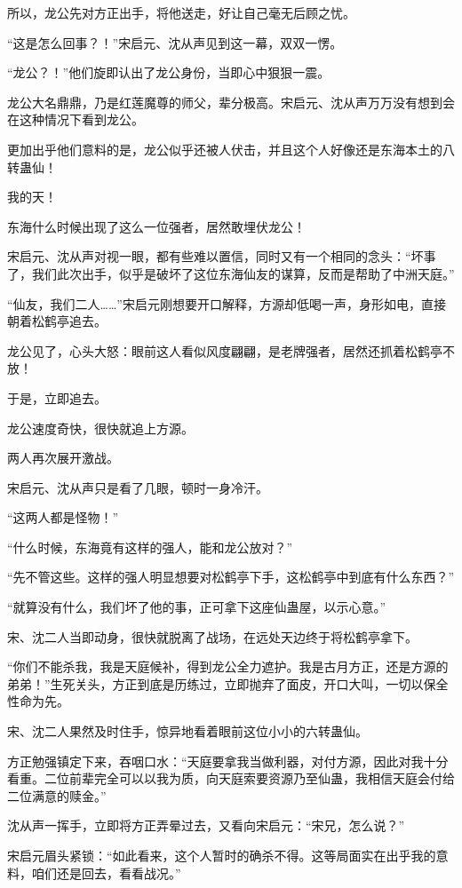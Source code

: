 \begin{this_body}
所以，龙公先对方正出手，将他送走，好让自己毫无后顾之忧。

“这是怎么回事？！”宋启元、沈从声见到这一幕，双双一愣。

“龙公？！”他们旋即认出了龙公身份，当即心中狠狠一震。

龙公大名鼎鼎，乃是红莲魔尊的师父，辈分极高。宋启元、沈从声万万没有想到会在这种情况下看到龙公。

更加出乎他们意料的是，龙公似乎还被人伏击，并且这个人好像还是东海本土的八转蛊仙！

我的天！

东海什么时候出现了这么一位强者，居然敢埋伏龙公！

宋启元、沈从声对视一眼，都有些难以置信，同时又有一个相同的念头：“坏事了，我们此次出手，似乎是破坏了这位东海仙友的谋算，反而是帮助了中洲天庭。”

“仙友，我们二人……”宋启元刚想要开口解释，方源却低喝一声，身形如电，直接朝着松鹤亭追去。

龙公见了，心头大怒：眼前这人看似风度翩翩，是老牌强者，居然还抓着松鹤亭不放！

于是，立即追去。

龙公速度奇快，很快就追上方源。

两人再次展开激战。

宋启元、沈从声只是看了几眼，顿时一身冷汗。

“这两人都是怪物！”

“什么时候，东海竟有这样的强人，能和龙公放对？”

“先不管这些。这样的强人明显想要对松鹤亭下手，这松鹤亭中到底有什么东西？”

“就算没有什么，我们坏了他的事，正可拿下这座仙蛊屋，以示心意。”

宋、沈二人当即动身，很快就脱离了战场，在远处天边终于将松鹤亭拿下。

“你们不能杀我，我是天庭候补，得到龙公全力遮护。我是古月方正，还是方源的弟弟！”生死关头，方正到底是历练过，立即抛弃了面皮，开口大叫，一切以保全性命为先。

宋、沈二人果然及时住手，惊异地看着眼前这位小小的六转蛊仙。

方正勉强镇定下来，吞咽口水：“天庭要拿我当做利器，对付方源，因此对我十分看重。二位前辈完全可以以我为质，向天庭索要资源乃至仙蛊，我相信天庭会付给二位满意的赎金。”

沈从声一挥手，立即将方正弄晕过去，又看向宋启元：“宋兄，怎么说？”

宋启元眉头紧锁：“如此看来，这个人暂时的确杀不得。这等局面实在出乎我的意料，咱们还是回去，看看战况。”


\end{this_body}

